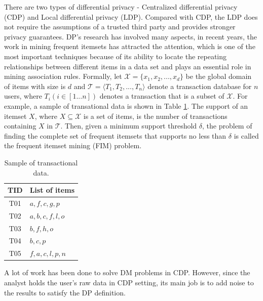 \documentclass[conference]{IEEEtran}
\begin{document}
There are two types of differential privacy - Centralized differential privacy (CDP) and Local differential privacy (LDP). Compared with CDP, the LDP does not require the assumptions of a trusted third party and provides stronger privacy guarantees.  {\color{red}DP's research has involved many aspects, in recent years, the work in mining frequent itemsets has attracted the attention, which is one of  the most important techniques because of its ability to locate the repeating relationships between different items in a data set and plays an essential role in mining association rules\cite{apriori}. Formally, let $\mathcal{X} = \{x_1,x_2,...,x_d\}$ be the global domain of items with size is $d$ and $\mathcal{T} = \langle T_1,T_2,...,T_n \rangle$ denote a transaction database for $n$ users, where $T_i(i \in [1...n])$ denotes a transaction that is a subset of $\mathcal{X}$. For example, a sample of transational data is shown in Table \ref{trans table}. The support of an itemset $X$, where $X \subseteq \mathcal{X}$ is a set of items, is the number of transactions containing $X$ in $\mathcal{T}$. Then, given a minimum support threshold $\delta$, the problem of finding the complete set of frequent itemsets that supports no less than $\delta$ is called the frequent itemset mining (FIM) problem.}

\begin{table}[bp]
\caption{{\color{red}Sample of transactional data.}}
\begin{center}
\begin{tabular}{|c|l|}\hline
  TID&List of items \\\hline
  T01&$a,f,c,g,p$ \\\hline
  T02&$a,b,c,f,l,o$ \\\hline
  T03&$b,f,h,o$ \\\hline
  T04&$b,c,p$ \\\hline
  T05&$f,a,c,l,p,n$ \\\hline
\end{tabular}
\label{trans table}
\end{center}
\end{table}

A lot of work\cite{a3,a4,a5,a6} has been done to solve DM problems in CDP. However, since the analyst holds the user's raw data in CDP setting, its main job is to add noise to the results to satisfy the DP definition.
\end{document}
